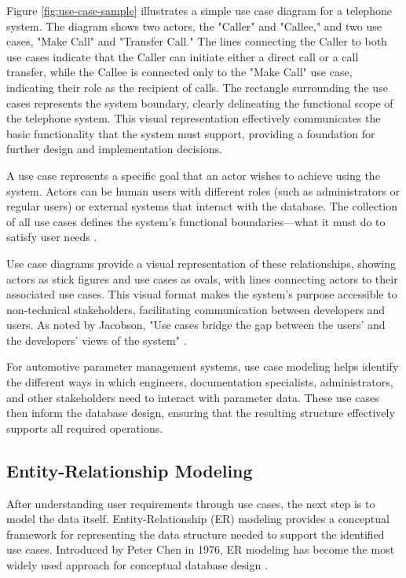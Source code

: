 Figure \ref{fig:use-case-sample} illustrates a simple use case diagram for a telephone system. The diagram shows two actors, the "Caller" and "Callee," and two use cases, "Make Call" and "Transfer Call." The lines connecting the Caller to both use cases indicate that the Caller can initiate either a direct call or a call transfer, while the Callee is connected only to the "Make Call" use case, indicating their role as the recipient of calls. The rectangle surrounding the use cases represents the system boundary, clearly delineating the functional scope of the telephone system. This visual representation effectively communicates the basic functionality that the system must support, providing a foundation for further design and implementation decisions.

A use case represents a specific goal that an actor wishes to achieve using the system. Actors can be human users with different roles (such as administrators or regular users) or external systems that interact with the database. The collection of all use cases defines the system's functional boundaries—what it must do to satisfy user needs \cite{jacobson2004use}.

Use case diagrams provide a visual representation of these relationships, showing actors as stick figures and use cases as ovals, with lines connecting actors to their associated use cases. This visual format makes the system's purpose accessible to non-technical stakeholders, facilitating communication between developers and users. As noted by Jacobson, "Use cases bridge the gap between the users' and the developers' views of the system" \cite{jacobson2004use}.

For automotive parameter management systems, use case modeling helps identify the different ways in which engineers, documentation specialists, administrators, and other stakeholders need to interact with parameter data. These use cases then inform the database design, ensuring that the resulting structure effectively supports all required operations.


\subsection{Entity-Relationship Modeling}
\label{subsec:entity-relationship-modeling}

After understanding user requirements through use cases, the next step is to model the data itself. Entity-Relationship (ER) modeling provides a conceptual framework for representing the data structure needed to support the identified use cases. Introduced by Peter Chen in 1976, ER modeling has become the most widely used approach for conceptual database design \cite{chen1976entity}.

